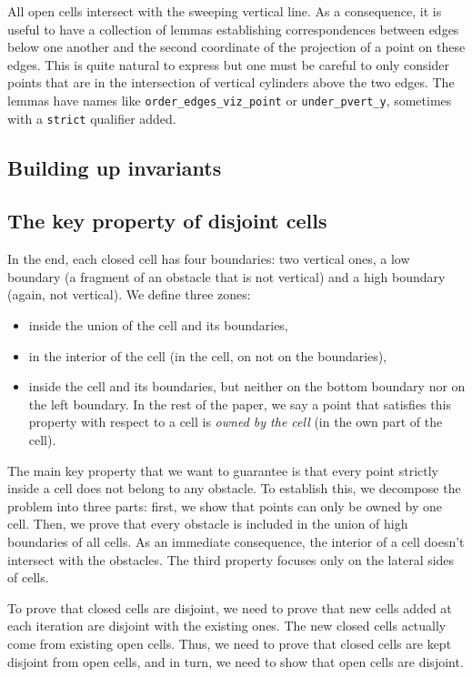 \documentclass[a4paper, USenglish, cleveref, autoref, thm-restate, final]{lipics-v2021}
\begin{document}
All open cells intersect with the sweeping vertical line.  As a
consequence, it is useful to have a collection of lemmas establishing
correspondences between edges below one another and the second coordinate
of the projection of a point on these edges.  This is quite natural to
express but one must be careful to only consider points that are in
the intersection of vertical cylinders above the two edges.  The lemmas
have names like {\tt order\_edges\_viz\_point} or {\tt under\_pvert\_y},
sometimes with a {\tt strict} qualifier added.

\subsection{Building up invariants}
\subsection{The key property of disjoint cells}
In the end, each closed cell has four boundaries: two vertical ones, a
low boundary (a fragment of an obstacle that is not vertical) and a
high boundary (again, not vertical).  We define three zones:
\begin{itemize}
\item inside the union of the cell and its boundaries,
\item in the interior of the cell (in the cell, on not on the boundaries),
\item inside the cell and its
 boundaries, but neither on the bottom boundary nor on the left
 boundary.  In the rest of the paper, we say a point that satisfies
 this property with respect to a cell is {\em owned by the cell} (in the
 own part of the cell).
\end{itemize}
The main key property that we want to guarantee is that every point
strictly inside a cell does not belong to any obstacle.  To establish
this, we decompose the problem into three parts: first, we show
that points can only be owned by one cell.
Then, we prove that every obstacle is included in the union of high boundaries of
all cells.  As an immediate consequence, the interior of a cell doesn't intersect
with the obstacles.  The third property focuses only on the
lateral sides of cells.

To prove that closed cells are disjoint, we need to prove that new
cells added at each iteration are disjoint with the existing ones.
The new closed cells actually come from
existing open cells.  Thus, we need to prove that
closed cells are kept disjoint from open cells, and in turn, we need to
show that open cells are disjoint.
\end{document}

